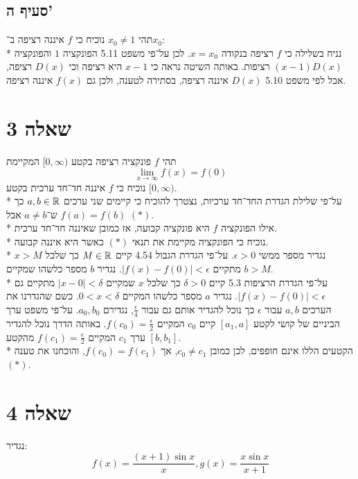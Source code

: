\subsection{סעיף ה'}
תהי $x_0 \ne 1$ נוכיח כי $f$ איננה רציפה ב־$x_0$: \\*
נניח בשלילה כי $f$ רציפה בנקודה $x = x_0$.
לכן על־פי משפט 5.11 הפונקציה $1$ והפונקציה $(x - 1) D(x)$ רציפות.
באותה השיטה נראה כי $x - 1$ היא רציפה וכי $D(x)$ רציפה,
אבל לפי משפט 5.10 $D(x)$ איננה רציפה, בסתירה לטענה, ולכן גם $f(x)$ איננה רציפה.

\section{שאלה 3}
תהי $f$ פונקציה רציפה בקטע $[0, \infty)$ המקיימת %
\[
	\lim_{x \to \infty} f(x) = f(0)
\]
נוכיח כי $f$ איננה חד־חד ערכית בקטע $[0, \infty)$. \\* %
על־פי שלילת הגדרת החד־חד ערכיות, נצטרך להוכיח כי קיימים שני ערכים $a, b \in \mathbb{R}$ כך ש־$a \ne b$ אבל $f(a) = f(b)$ $(*)$. \\*
אילו הפונקציה $f$ היא פונקציה קבועה, אז כמובן שאיננה חד־חד ערכית. \\*
נוכיח כי הפונקציה מקיימת את תנאי $(*)$ כאשר היא איננה קבועה. \\*
נגדיר מספר ממשי $\epsilon > 0$.
על־פי הגדרת הגבול 4.54 קיים $M \in \mathbb{R}$ כך שלכל $x > M$ מתקיים $|f(x) - f(0)| < \epsilon$. נגדיר $b$ מספר כלשהו שמקיים $b > M$. \\*
על־פי הגדרת הרציפות 5.3 קיים $\delta > 0$ כך שלכל $x$ שמקיים $|x - 0| < \delta$ מתקיים גם $|f(x) - f(0)| < \epsilon$.
נגדיר $a$ מספר כלשהו המקיים $0 < x < \delta$.
כשם שהגדרנו את הערכים $a, b$ עבור $\epsilon$ כך נוכל להגדיר אותם גם עבור $\frac{\epsilon}{4}$, נגדירם $a_0, b_0$.
על־פי משפט ערך הביניים של קושי לקטע $[a_1, a]$ קיים $c_0$ המקיים $f(c_0) = \frac{\epsilon}{2}$.
באותה הדרך נוכל להגדיר ערך $c_1$ המקיים $f(c_1) = \frac{\epsilon}{2}$ מהקטע $[b, b_1]$. \\*
הקטעים הללו אינם חופפים, לכן כמובן $c_0 \ne c_1$, אך $f(c_0) = f(c_1)$, והוכחנו את טענה $(*)$.

\section{שאלה 4}
נגדיר:
\[
	f(x) = \frac{(x + 1) \sin x}{x},
	g(x) = \frac{x \sin x}{x + 1}
\]

